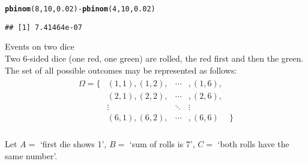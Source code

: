 \documentclass[bigtut]{tutorial}\usepackage[]{graphicx}\usepackage[]{color}
\makeatletter
\newcommand{\hlnum}[1]{\textcolor[rgb]{0.686,0.059,0.569}{#1}}%
\newcommand{\hlopt}[1]{\textcolor[rgb]{0,0,0}{#1}}%
\newcommand{\hlstd}[1]{\textcolor[rgb]{0.345,0.345,0.345}{#1}}%
\newcommand{\hlkwd}[1]{\textcolor[rgb]{0.737,0.353,0.396}{\textbf{#1}}}%
\newenvironment{kframe}{%
 \def\at@end@of@kframe{}%
 \ifinner\ifhmode%
  \def\at@end@of@kframe{\end{minipage}}%
  \begin{minipage}{\columnwidth}%
 \fi\fi%
 \def\FrameCommand##1{\hskip\@totalleftmargin \hskip-\fboxsep
 \colorbox{shadecolor}{##1}\hskip-\fboxsep
     \hskip-\linewidth \hskip-\@totalleftmargin \hskip\columnwidth}%
 \MakeFramed {\advance\hsize-\width
   \@totalleftmargin\z@ \linewidth\hsize
   \@setminipage}}%
 {\par\unskip\endMakeFramed%
 \at@end@of@kframe}
\newenvironment{knitrout}{}{} %
\makeatother
\begin{document}
\begin{tutorial}
\begin{questions}
\begin{solution}
\begin{knitrout}
\color{fgcolor}\begin{kframe}
\begin{alltt}
\hlkwd{pbinom}\hlstd{(}\hlnum{8}\hlstd{,}\hlnum{10}\hlstd{,}\hlnum{0.02}\hlstd{)}\hlopt{-}\hlkwd{pbinom}\hlstd{(}\hlnum{4}\hlstd{,}\hlnum{10}\hlstd{,}\hlnum{0.02}\hlstd{)}
\end{alltt}
\begin{verbatim}
## [1] 7.41464e-07
\end{verbatim}
\end{kframe}
\end{knitrout}
\end{solution}



\question Events on two dice  \\

Two 6-sided dice (one red, one green) are rolled, the red first and then the green. The set of all possible outcomes may be represented as follows:
\begin{eqnarray*}
  \begin{array}{ccrcl}
    \Omega=\{&(1,1),(1,2),&\cdots&,(1,6),&\\
    &(2,1),(2,2),&\cdots&,(2,6),&\\
    & \vdots&\ddots&\vdots&\\
    &(6,1),(6,2),&\cdots&,(6,6)&\}\\
  \end{array}
\end{eqnarray*}

Let $A=$ `first die shows 1', $B=$ `sum of rolls is 7', $C=$ `both rolls have the same number'. \\




\end{questions}
\end{tutorial}
\end{document}
